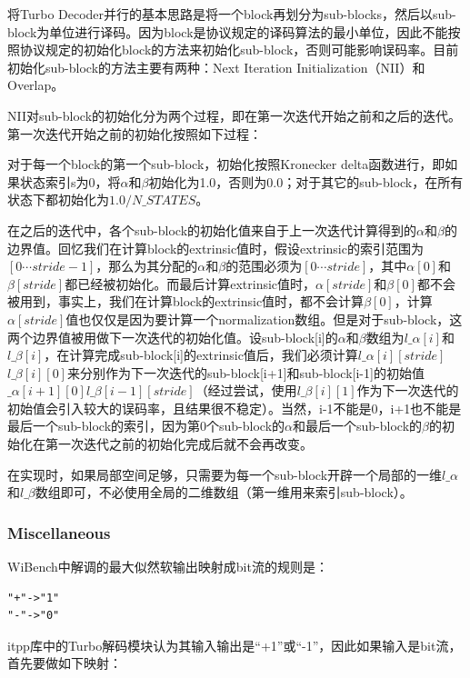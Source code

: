 \documentclass[titlepage]{article}
\numberwithin{figure}{section}
\numberwithin{equation}{section}
\begin{document}
将Turbo Decoder并行的基本思路是将一个block再划分为sub-blocks，然后以sub-block为单位进行译码。因为block是协议规定的译码算法的最小单位，因此不能按照协议规定的初始化block的方法来初始化sub-block，否则可能影响误码率。目前初始化sub-block的方法主要有两种：Next Iteration Initialization（NII）\cite{yoon}和Overlap\cite{hsu}。

NII对sub-block的初始化分为两个过程，即在第一次迭代开始之前和之后的迭代。第一次迭代开始之前的初始化按照如下过程：

对于每一个block的第一个sub-block，初始化按照Kronecker delta函数进行，即如果状态索引s为0，将$\alpha$和$\beta$初始化为1.0，否则为0.0；对于其它的sub-block，在所有状态下都初始化为$1.0/N\_{STATES}$。

在之后的迭代中，各个sub-block的初始化值来自于上一次迭代计算得到的$\alpha$和$\beta$的边界值。回忆我们在计算block的extrinsic值时，假设extrinsic的索引范围为$[0\cdots stride-1]$，那么为其分配的$\alpha$和$\beta$的范围必须为$[0\cdots stride]$，其中$\alpha[0]$和$\beta[stride]$都已经被初始化。而最后计算extrinsic值时，$\alpha[stride]$和$\beta[0]$都不会被用到，事实上，我们在计算block的extrinsic值时，都不会计算$\beta[0]$，计算$\alpha[stride]$值也仅仅是因为要计算一个normalization数组。但是对于sub-block，这两个边界值被用做下一次迭代的初始化值。设sub-block[i]的$\alpha$和$\beta$数组为$l\_\alpha[i]$和$l\_\beta[i]$，在计算完成sub-block[i]的extrinsic值后，我们必须计算$l\_\alpha[i][stride]$$l\_\beta[i][0]$来分别作为下一次迭代的sub-block[i+1]和sub-block[i-1]的初始值$\_\alpha[i+1][0]$$l\_\beta[i-1][stride]$（经过尝试，使用$l\_\beta[i][1]$作为下一次迭代的初始值会引入较大的误码率，且结果很不稳定）。当然，i-1不能是0，i+1也不能是最后一个sub-block的索引，因为第0个sub-block的$\alpha$和最后一个sub-block的$\beta$的初始化在第一次迭代之前的初始化完成后就不会再改变。

在实现时，如果局部空间足够，只需要为每一个sub-block开辟一个局部的一维$l\_\alpha$和$l\_\beta$数组即可，不必使用全局的二维数组（第一维用来索引sub-block）。

\subsubsection{Miscellaneous}

WiBench中解调的最大似然软输出映射成bit流的规则是：

\begin{verbatim}
"+"->"1"
"-"->"0"
\end{verbatim}

itpp库中的Turbo解码模块认为其输入输出是“+1”或“-1”，因此如果输入是bit流，首先要做如下映射：
\end{document}
